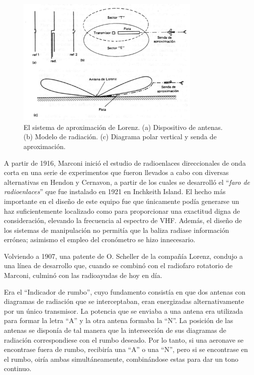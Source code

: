 \begin{figure}[!hbt]
  \centering  \includegraphics[keepaspectratio,width=0.8\textwidth]{Imagenes/06.02.vor.imagenes/Loran.eps}
    \caption{El sistema de aproximaci\'on de Lorenz.
	(a) Dispositivo de antenas. (b) Modelo de radiaci\'on. (c) Diagrama polar vertical y senda de aproximaci\'on.
}
    \label{fig:sistema.lorenz}
\end{figure}

A partir de 1916, Marconi inici\'o el estudio de radioenlaces direccionales de onda corta en una serie de experimentos que fueron llevados a cabo con diversas alternativas en Hendon y Cernavon, a partir de los cuales se desarroll\'o el ``\emph{faro de radioenlaces}'' que fue instalado en 1921 en Inchkeith Island. El hecho m\'as importante en el dise\~no de este equipo fue que \'unicamente pod\'ia generarse un haz suficientemente localizado como para proporcionar una exactitud digna de consideraci\'on, elevando la frecuencia al espectro de VHF. Adem\'as, el dise\~no de los sistemas de manipulaci\'on no permit\'ia que la baliza radiase informaci\'on err\'onea; asimismo el empleo del cron\'ometro se hizo innecesario.

Volviendo a 1907, una patente de O. Scheller de la compa\~n\'ia Lorenz, condujo a una l\'inea de desarrollo que, cuando se combin\'o con el radiofaro rotatorio de Marconi, culmin\'o con las radioayudas de hoy en d\'ia.

Era el ``Indicador de rumbo'', cuyo fundamento consist\'ia en que dos antenas con diagramas de radiaci\'on que se interceptaban, eran energizadas alternativamente por un \'unico transmisor. La potencia que se enviaba a una antena era utilizada para formar la letra ``A'' y la otra antena formaba la ``N''. La posici\'on de las antenas se dispon\'ia de tal manera que la intersecci\'on de sus diagramas de radiaci\'on correspondiese con el rumbo deseado. Por lo tanto, si una aeronave se encontrase fuera de rumbo, recibir\'ia una ``A'' o una  ``N'', pero si se encontrase en el rumbo, oir\'ia ambas simult\'aneamente, combin\'andose estas para dar un tono continuo.

